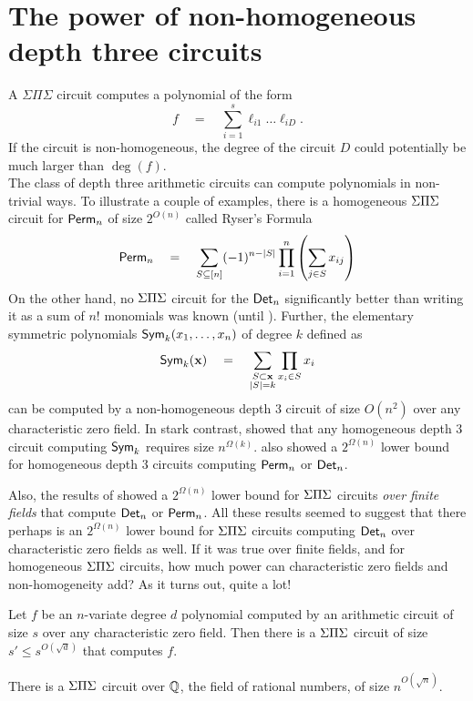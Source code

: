 \chapter{The power of non-homogeneous depth three circuits}
\label{chap:d3nonhom}

A $\Sigma\Pi\Sigma$ circuit computes a polynomial of the form
\[
f\quad=\quad \sum_{i=1}^s \ell_{i1}\dots \ell_{iD}.
\]
If the circuit is non-homogeneous, the degree of the circuit $D$ could potentially be much larger than $\deg(f)$. \\

The class of depth three arithmetic circuits can compute polynomials
in non-trivial ways.
To illustrate a couple of examples, there is a homogeneous $\Sigma\Pi\Sigma$
circuit for $\operatorname{\mathsf{Perm}}_n$ of size $2^{O(n)}$ called Ryser's Formula
\cite{rys63}
\begin{equation}\label{eqn:ryser}
\operatorname{\mathsf{Perm}}_n \quad = \quad \sum_{S \subseteq[n]} (-1)^{n - |S|} \prod_{i=1}^n \left(\sum_{j\in S} x_{ij}\right)
\end{equation}
On the other hand, no $\Sigma\Pi\Sigma$ circuit for the $\operatorname{\mathsf{Det}}_n$ significantly
better than writing it as a sum of $n!$ monomials was known (until
\cite{gkks13b}). 
Further, the elementary symmetric polynomials $\operatorname{\mathsf{Sym}}_k(x_1,\dots,
x_n)$ of degree $k$ defined as
\[
\operatorname{\mathsf{Sym}}_k(\mathbf{x}) \quad = \quad \sum_{\substack{S\subset \mathbf{x}\\|S| = k}} \prod_{x_i\in S}x_i
\]
can be computed by a non-homogeneous depth $3$ circuit of size
$O(n^2)$ over any characteristic zero field.
In stark contrast, \cite{nw1997} showed that any homogeneous depth $3$
circuit computing $\operatorname{\mathsf{Sym}}_k$ requires size
$n^{\Omega(k)}$. \cite{nw1997} also showed a $2^{\Omega(n)}$ lower
bound for homogeneous depth $3$ circuits computing $\operatorname{\mathsf{Perm}}_n$ or
$\operatorname{\mathsf{Det}}_n$. 

Also, the results of \cite{gr00,grigoriev98} showed a $2^{\Omega(n)}$
lower bound for $\Sigma\Pi\Sigma$ circuits \emph{over finite fields} that compute
$\operatorname{\mathsf{Det}}_n$ or $\operatorname{\mathsf{Perm}}_n$.
All these results seemed to suggest that there perhaps is an
$2^{\Omega(n)}$ lower bound for $\Sigma\Pi\Sigma$ circuits computing $\operatorname{\mathsf{Det}}_n$
over characteristic zero fields as well.
If it was true over finite fields, and for homogeneous $\Sigma\Pi\Sigma$
circuits, how much power can characteristic zero fields and
non-homogeneity add? 
As it turns out, quite a lot!

\begin{theorem} \label{thm:chasm-at-3} Let $f$ be an
  $n$-variate degree $d$ polynomial computed by an arithmetic circuit
  of size $s$ over any characteristic zero field.
  Then there is a $\Sigma\Pi\Sigma$ circuit of size $s' \leq s^{O(\sqrt{d})}$
  that computes $f$. 
\end{theorem}
\begin{corollary}\label{cor:det-sps}
There is a $\Sigma\Pi\Sigma$ circuit over $\mathbb{Q}$, the field of rational numbers, of size $n^{O(\sqrt{n})}$. 
\end{corollary}


